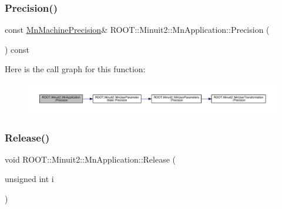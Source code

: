 \subsubsection{\texorpdfstring{Precision()}{Precision()}\hspace{0.1cm}{\footnotesize\ttfamily [2/2]}}
{\footnotesize\ttfamily const \mbox{\hyperlink{classROOT_1_1Minuit2_1_1MnMachinePrecision}{Mn\+Machine\+Precision}}\& R\+O\+O\+T\+::\+Minuit2\+::\+Mn\+Application\+::\+Precision (\begin{DoxyParamCaption}{ }\end{DoxyParamCaption}) const\hspace{0.3cm}{\ttfamily [inline]}}

Here is the call graph for this function\+:
\nopagebreak
\begin{figure}[H]
\begin{center}
\leavevmode
\includegraphics[width=350pt]{df/dd5/classROOT_1_1Minuit2_1_1MnApplication_a8de6eb3be52721cec183ba830504e7bc_cgraph}
\end{center}
\end{figure}
\mbox{\label{classROOT_1_1Minuit2_1_1MnApplication_ab690313ed666d5a794a13b05054f5575}} 
\subsubsection{\texorpdfstring{Release()}{Release()}\hspace{0.1cm}{\footnotesize\ttfamily [1/4]}}
{\footnotesize\ttfamily void R\+O\+O\+T\+::\+Minuit2\+::\+Mn\+Application\+::\+Release (\begin{DoxyParamCaption}\item[{unsigned int}]{i }\end{DoxyParamCaption})}


